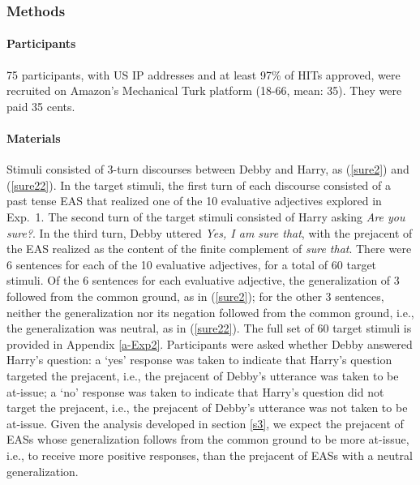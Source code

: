 \documentclass[11pt,fleqn]{article}
\newcommand{\6}{\mbox{$[\hspace*{-.6mm}[$}}
\newcommand{\9}{\mbox{$]\hspace*{-.6mm}]$}}
\begin{document}
\subsubsection{Methods}

\paragraph{Participants} 75 participants, with US IP addresses and at least 97\% of HITs approved, were recruited on Amazon's Mechanical Turk platform (18-66, mean: 35). They were paid 35 cents.

\paragraph{Materials} Stimuli consisted of 3-turn discourses between Debby and Harry, as (\ref{sure2}) and (\ref{sure22}). In the target stimuli, the first turn of each discourse consisted of a past tense EAS that realized one of the 10 evaluative adjectives explored in Exp.~1. The second turn of the target stimuli consisted of Harry asking {\em Are you sure?}. In the third turn, Debby uttered {\em Yes, I am sure that}, with the prejacent of the EAS realized as the content of the finite complement of {\em sure that}. There were 6 sentences for each of the 10 evaluative adjectives, for a total of 60 target stimuli. Of the 6 sentences for each evaluative adjective, the generalization of 3 followed from the common ground, as in (\ref{sure2}); for the other 3 sentences, neither the generalization nor its negation followed from the common ground, i.e., the generalization was neutral, as in (\ref{sure22}). The full set of 60 target stimuli is provided in Appendix \ref{a-Exp2}. Participants were asked whether Debby answered Harry's question: a `yes' response was taken to indicate that Harry's question targeted the prejacent, i.e., the prejacent of Debby's utterance was taken to be at-issue; a `no' response was taken to indicate that Harry's question did not target the prejacent, i.e., the prejacent of Debby's utterance was not taken to be at-issue. Given the analysis developed in section \ref{s3}, we expect the prejacent of EASs whose generalization follows from the common ground to be more at-issue, i.e., to receive more positive responses, than the prejacent of EASs with a neutral generalization.
\end{document}
